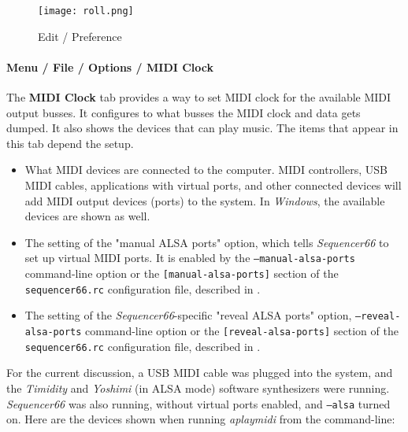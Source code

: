 \begin{figure}[H]
   \centering 
   \texttt{[image: roll.png]}
   \caption{Edit / Preference}
   \label{fig:seq66_options_tab_0_9_18}
\end{figure}

\paragraph{Menu / File / Options / MIDI Clock}
\label{paragraph:seq66_menu_file_options_midi_clock}

   The \textbf{MIDI Clock} tab provides a way to set MIDI clock for
   the available MIDI output busses.
   It configures to what busses the MIDI clock and data gets dumped.
   It also shows the devices that can play music.
   The items that appear in this tab depend the setup.

   \begin{itemize}
      \item What MIDI devices are connected to the computer.
         MIDI controllers, USB MIDI cables, applications with virtual
         ports, and other connected devices will add MIDI
         output devices (ports) to the system.
         In \textsl{Windows}, the available devices are shown as well.
      \item The setting of the "manual ALSA ports" option, which tells
         \textsl{Sequencer66} to set up virtual MIDI ports.
         It is enabled by the
         \texttt{--manual-alsa-ports} command-line option or the
         \texttt{[manual-alsa-ports]} section of the
         \texttt{sequencer66.rc} configuration file, described in
         .
      \item The setting of the \textsl{Sequencer66}-specific
         "reveal ALSA ports" option,
         \texttt{--reveal-alsa-ports} command-line option or the
         \texttt{[reveal-alsa-ports]} section of the
         \texttt{sequencer66.rc} configuration file, described in
         .
   \end{itemize}

   For the current discussion, a USB MIDI cable was plugged into the system,
   and the \textsl{Timidity} and \textsl{Yoshimi} (in ALSA mode) software
   synthesizers were running.  \textsl{Sequencer66} was also running,
   without virtual ports enabled, and \texttt{--alsa} turned on.
   Here are the devices shown when running \textsl{aplaymidi}
   from the command-line:

